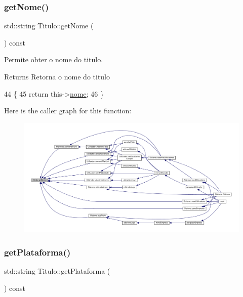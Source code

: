 \subsubsection{\texorpdfstring{get\+Nome()}{getNome()}}
{\footnotesize\ttfamily std\+::string Titulo\+::get\+Nome (\begin{DoxyParamCaption}{ }\end{DoxyParamCaption}) const}



Permite obter o nome do titulo. 

\begin{DoxyReturn}{Returns}
Retorna o nome do titulo 
\end{DoxyReturn}

\begin{DoxyCode}
44                                 \{
45         \textcolor{keywordflow}{return} this->\hyperlink{classTitulo_a8abdf1fc6d4fc14be20bbec247664d83}{nome};
46  \}
\end{DoxyCode}
Here is the caller graph for this function\+:
\nopagebreak
\begin{figure}[H]
\begin{center}
\leavevmode
\includegraphics[width=350pt]{classTitulo_acb79279860b3404c6419697df5f860cb_icgraph}
\end{center}
\end{figure}
\mbox{\label{classTitulo_a2a57a31d40c5df012b3c6e2451c253dd}} 
\subsubsection{\texorpdfstring{get\+Plataforma()}{getPlataforma()}}
{\footnotesize\ttfamily std\+::string Titulo\+::get\+Plataforma (\begin{DoxyParamCaption}{ }\end{DoxyParamCaption}) const}



